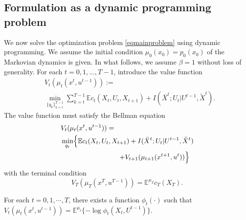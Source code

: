 \subsection{Formulation as a dynamic programming problem}
We now solve the optimization problem \eqref{eqmainproblem} using dynamic programming. We assume the initial condition $\mu_0(x_0)=p_0(x_0)$ of the Markovian dynamics is given. In what follows, we assume $\beta=1$ without loss of generality. For each $t=0, 1, ... , T-1$, introduce the value function
\begin{align*}
&V_t(\mu_t(x^t, u^{t-1})):= \\
& \min_{\{q_k\}_{k=t}^{T-1}} \sum_{k=t}^{T-1} \mathbb{E}c_t(X_t, U_t, X_{t+1})+I(\bar{X}^t; U_t|U^{t-1}, \tilde{X}^t).
\end{align*}
The value function must satisfy the Bellman equation
\begin{align}
&V_t(\mu_t(x^t, u^{t-1}))= \nonumber \\
&\min_{q_t} \Bigl\{ \mathbb{E}c_t(X_t, U_t, X_{t+1})+ I(\bar{X}^t; U_t|U^{t-1}, \tilde{X}^t) \Bigr. \nonumber \\
&\hspace{20ex}\Bigl. + V_{t+1}(\mu_{t+1}(x^{t+1}, u^t)) \Bigr\} \label{eqbellman}
\end{align}
with the terminal condition
\[
V_T(\mu_T(x^T, u^{T-1}))=\mathbb{E}^{\mu_T} c_T(X_T).
\]
\begin{lemma}\label{lemvalue}
For each $t=0, 1, \cdots , T$, there exists a function $\phi_t(\cdot)$ such that
$V_t(\mu_t(x^t, u^{t-1}))=\mathbb{E}^{\mu_t}\{-\log \phi_t(X_t, U^{t-1})\}$.
\end{lemma}
